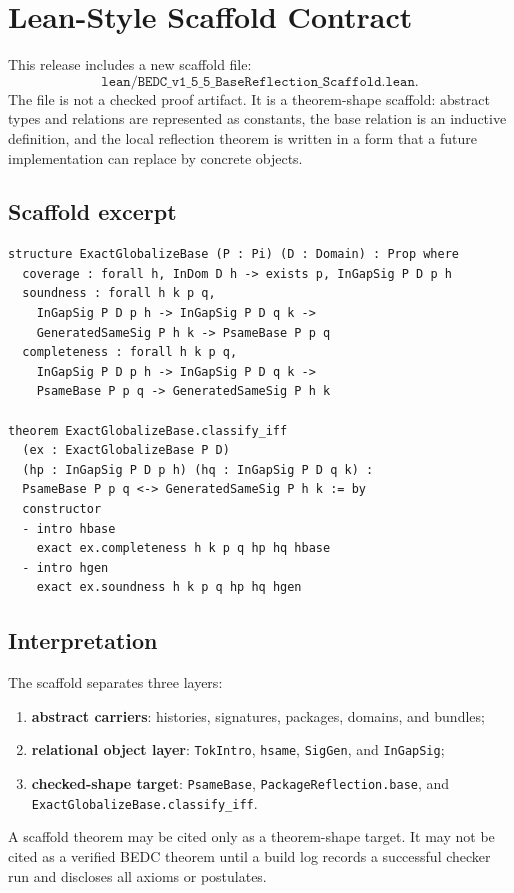 \chapter{Lean-Style Scaffold Contract}
\label{ch:v155-lean-scaffold-contract}

This release includes a new scaffold file:
\[
  \texttt{lean/BEDC\_v1\_5\_5\_BaseReflection\_Scaffold.lean}.
\]
The file is not a checked proof artifact. It is a theorem-shape scaffold: abstract types and relations are represented as constants, the base relation is an inductive definition, and the local reflection theorem is written in a form that a future implementation can replace by concrete objects.

\section{Scaffold excerpt}
\begin{lstlisting}[language={}]
structure ExactGlobalizeBase (P : Pi) (D : Domain) : Prop where
  coverage : forall h, InDom D h -> exists p, InGapSig P D p h
  soundness : forall h k p q,
    InGapSig P D p h -> InGapSig P D q k ->
    GeneratedSameSig P h k -> PsameBase P p q
  completeness : forall h k p q,
    InGapSig P D p h -> InGapSig P D q k ->
    PsameBase P p q -> GeneratedSameSig P h k

theorem ExactGlobalizeBase.classify_iff
  (ex : ExactGlobalizeBase P D)
  (hp : InGapSig P D p h) (hq : InGapSig P D q k) :
  PsameBase P p q <-> GeneratedSameSig P h k := by
  constructor
  - intro hbase
    exact ex.completeness h k p q hp hq hbase
  - intro hgen
    exact ex.soundness h k p q hp hq hgen
\end{lstlisting}

\section{Interpretation}
The scaffold separates three layers:
\begin{enumerate}
  \item \textbf{abstract carriers}: histories, signatures, packages, domains, and bundles;
  \item \textbf{relational object layer}: \texttt{TokIntro}, \texttt{hsame}, \texttt{SigGen}, and \texttt{InGapSig};
  \item \textbf{checked-shape target}: \texttt{PsameBase}, \texttt{PackageReflection.base}, and \texttt{ExactGlobalizeBase.classify\_iff}.
\end{enumerate}

\begin{principle}
\label{prin:v155-no-scaffold-laundering}
A scaffold theorem may be cited only as a theorem-shape target. It may not be cited as a verified BEDC theorem until a build log records a successful checker run and discloses all axioms or postulates.
\end{principle}
